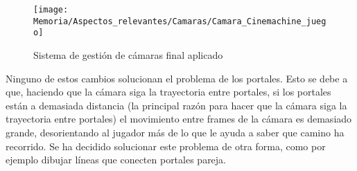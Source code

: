 \begin{figure}[h]
\texttt{[image: Memoria/Aspectos\_relevantes/Camaras/Camara\_Cinemachine\_juego]}
\caption{Sistema de gestión de cámaras final aplicado}
\end{figure}

Ninguno de estos cambios solucionan el problema de los portales. Esto se debe a que, haciendo que la cámara siga la trayectoria entre portales, si los portales están a demasiada distancia (la principal razón para hacer que la cámara siga la trayectoria entre portales) el movimiento entre frames de la cámara es demasiado grande, desorientando al jugador más de lo que le ayuda a saber que camino ha recorrido. Se ha decidido solucionar este problema de otra forma, como por ejemplo dibujar líneas que conecten portales pareja.